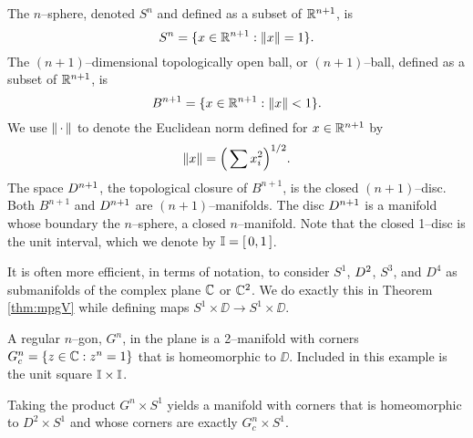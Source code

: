 \begin{ex}
	The $n$--sphere, denoted $S^n$ and defined as a subset of $\mathbb{R}^{n+1}$, is
	\[
	S^n = \{x\in\mathbb{R}^{n+1}:\left\lVert x \right\rVert=1\}.
	\]
	The $(n+1)$--dimensional topologically open ball, or $(n+1)$--ball, defined as a subset of $\mathbb{R}^{n+1}$, is
	\[
	B^{n+1} = \{x\in\mathbb{R}^{n+1}:\left\lVert x \right\rVert< 1\}.
	\]
	We use $\left\lVert \,\cdot\, \right\rVert$ to denote the Euclidean norm defined for $x\in\mathbb{R}^{n+1}$ by
	\[
	\left\lVert x \right\rVert = \Big( \sum x_i^2 \Big)^{1/2}.
	\]
	The space $D^{n+1}$, the topological closure of $B^{n+1}$, is the closed $(n+1)$--disc.
	Both $B^{n+1}$ and $D^{n+1}$ are $(n+1)$--manifolds.
	The disc $D^{n+1}$ is a manifold whose boundary the $n$--sphere, a closed $n$--manifold.
	Note that the closed 1--disc is the unit interval, which we denote by $\mathbb{I}=[\,0,1\,]$.
	
	It is often more efficient, in terms of notation, to consider $S^1$, $D^2$, $S^3$, and $D^4$ as submanifolds of the complex plane $\mathbb{C}$ or $\mathbb{C}^2$.
	We do exactly this in Theorem \ref{thm:mpgV} while defining maps $S^1\times\DD\to S^1\times\DD$.
\end{ex}

\begin{ex}
	A regular $n$--gon, $G^n$, in the plane is a 2--manifold with corners $G_c^n=\{z\in\mathbb{C}:z^n=1\}$ that is homeomorphic to $\DD$.
	Included in this example is the unit square $\mathbb{I}\times \mathbb{I}$.
	
	Taking the product $G^n\times S^1$ yields a manifold with corners that is homeomorphic to $D^2\times S^1$ and whose corners are exactly $G^n_c\times S^1$.	
\end{ex}


